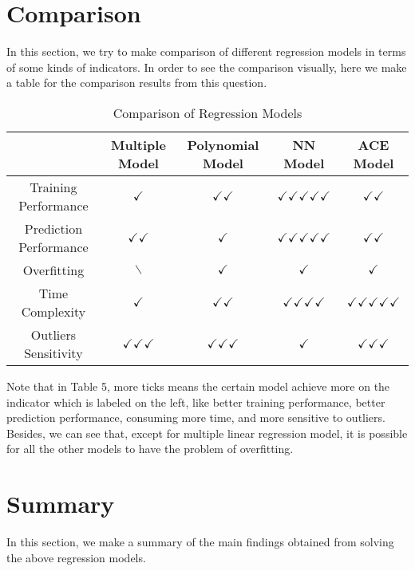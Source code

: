 \documentclass[12pt,a4paper]{article}
\begin{document}
\section{Comparison}
\qquad In this section, we try to make comparison of different regression models in terms of some kinds of indicators. In order to see the comparison visually, here we make a table for the comparison results from this question. \\

\begin{table}[h]
	\begin{tabular}{ccccc}
		\hline
		& Multiple Model & Polynomial Model & NN Model & ACE Model \\
		\hline
		Training Performance & $\checkmark$ & $\checkmark\checkmark$ & $\checkmark\checkmark\checkmark\checkmark\checkmark$ &  $\checkmark\checkmark$ \\
		Prediction Performance & $\checkmark\checkmark$ & $\checkmark$ & $\checkmark\checkmark\checkmark\checkmark\checkmark$ & $\checkmark\checkmark$ \\
		Overfitting & $\smallsetminus$ & $\checkmark$ & $\checkmark$ & $\checkmark$ \\
		Time Complexity & $\checkmark$ & $\checkmark\checkmark$ & $\checkmark\checkmark\checkmark\checkmark$ & $\checkmark\checkmark\checkmark\checkmark\checkmark$\\
		Outliers Sensitivity & $\checkmark\checkmark\checkmark$ & $\checkmark\checkmark\checkmark$ & $\checkmark$ & $\checkmark\checkmark\checkmark$ \\
		\hline
	\end{tabular}
	\caption{Comparison of Regression Models}
\end{table}
Note that in Table 5, more ticks means the certain model achieve more on the indicator which is labeled on the left, like better training performance, better prediction performance, consuming more time, and more sensitive to outliers. Besides, we can see that, except for multiple linear regression model, it is possible for all the other models to have the problem of overfitting.

\section{Summary}
\qquad In this section, we make a summary of the main findings obtained from solving the above regression models. 
\end{document}

